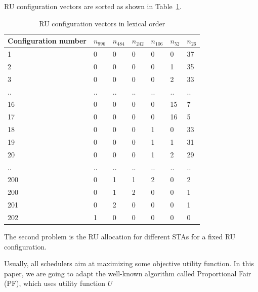 \documentclass[conference]{IEEEtran}
\begin{document}
%	
%
%
%
%
RU configuration vectors are sorted as shown in Table~\ref{table:vectors}. 
\begin{table}[!tbp]
	\caption{\label{table:vectors} RU configuration vectors in lexical order}
	\centering
	\begin{tabular}{|l|l|l|l|l|l|l|}
		\hline
		\textbf{Configuration number}	& \textbf{$n_{996}$} & \textbf{$n_{484}$} & \textbf{$n_{242}$}  &  \textbf{$n_{106}$} & \textbf{$n_{52}$} & \textbf{$n_{26}$}  \\
		\hline
		1  & 0 & 0 & 0 &0 &0 &37\\
		2  & 0 & 0 & 0 &0 &1 &35\\
		3  & 0 & 0 & 0 &0 &2 &33\\
		..  & ..& .. & .. & .. & .. & ..\\
		16 & 0 & 0 & 0 &0 &15 &7\\
		17 & 0 & 0 & 0 &0 &16 &5\\
		18 & 0 & 0& 0 &1 &0 &33\\
		19 & 0&  0& 0& 1 &1 &31\\
    	20 & 0&  0& 0& 1 &2 &29\\
		..  & ..& .. & .. & .. & .. & ..\\
		200 & 0 & 1 & 1 & 2 &0 &2\\
		200 & 0 & 1 & 2 &0 &0 &1\\
		201 & 0& 2 & 0 &0 &0 &1\\
		202 & 1& 0 & 0 &0 &0 &0\\
		\hline
	\end{tabular}
\end{table}
The second problem is the RU allocation for different STAs for a fixed RU configuration.

Usually, all schedulers aim at maximizing some objective utility function. In this paper, we are going to adapt the well-known algorithm called Proportional Fair (PF), which uses utility function $U$
\end{document}
